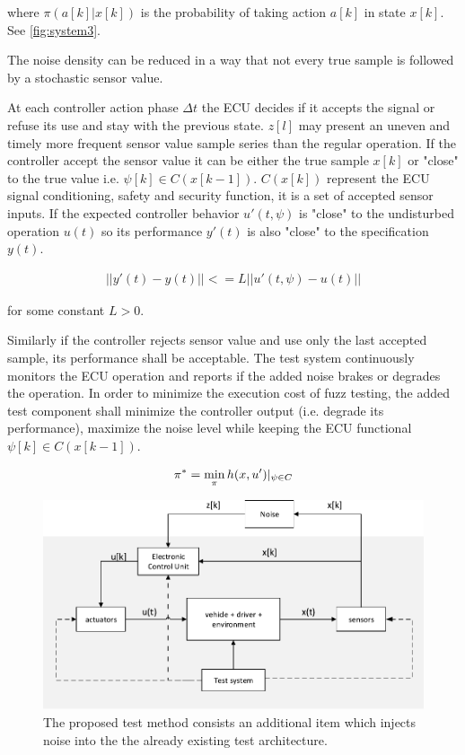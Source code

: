 \documentclass[a4paper, fleqn]{template/cas-dc}
\begin{document}
	where $\pi(a[k]|x[k])$ is the probability of taking action $a[k]$ in state $x[k]$. See \autoref{fig:system3}.
	
	The noise density can be reduced in a way that not every true sample is followed by a stochastic sensor value.
	
	At each controller action phase $\Delta t$ the ECU decides if it accepts the signal or refuse its use and stay with the previous state. $z[l]$ may present an uneven and timely more frequent sensor value sample series than the regular operation. If the controller accept the sensor value it can be either the true sample $x[k]$ or "close" to the true value i.e. $\psi[k] \in C(x[k-1])$. $C(x[k])$ represent the ECU signal conditioning, safety and security function, it is a set of accepted sensor inputs. If the expected controller behavior $u'(t, \psi)$ is "close" to the undisturbed operation $u(t)$ so its performance $y'(t)$ is also "close" to the specification $y(t)$. 
	
	\begin{align}
		||y'(t) - y(t)|| <= L||u'(t, \psi) - u(t)||
	\end{align}
	
	for some constant $L>0$.
	
	Similarly if the controller rejects sensor value and use only the last accepted sample, its performance shall be acceptable.
	The test system continuously monitors the ECU operation and reports if the added noise brakes or degrades the operation. 
	In order to minimize the execution cost of fuzz testing, the added test component shall minimize the controller output (i.e. degrade its performance), maximize the noise level while keeping the ECU functional $\psi[k] \in C(x[k-1])$.
	
	\begin{align}
		\pi^* = \min_{\pi}h(x,u')|_{\psi \in C}
	\end{align}
	
	\begin{figure}[h]
		\begin{center}
			\includegraphics[scale=0.5]{figures/system3_.pdf}
			\caption{The proposed test method consists an additional item which injects noise into the the already existing test architecture.}
			\label{fig:system3}
		\end{center}
	\end{figure}
	
\end{document}
